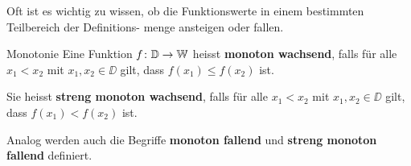 \begin{center}
\end{center}

Oft ist es wichtig zu wissen, ob die Funktionswerte in einem bestimmten Teilbereich der Definitions-
menge ansteigen oder fallen.

\begin{definition}
    {Monotonie}{}
    Eine Funktion \(f\colon \mathbb{D} \to \mathbb{W}\) heisst
    \textbf{monoton wachsend}, falls für alle
    \(x_1 < x_2\) mit \(x_1,x_2 \in \DD\) gilt, dass
    \(f(x_1) \leq f(x_2)\) ist.

    Sie heisst \textbf{streng monoton wachsend}, falls für alle
    \(x_1 < x_2\) mit \(x_1,x_2 \in \DD\) gilt, dass
    \(f(x_1) < f(x_2)\) ist.

    \medskip

    Analog werden auch die Begriffe \textbf{monoton fallend}
    und \textbf{streng monoton fallend} definiert.
\end{definition}

